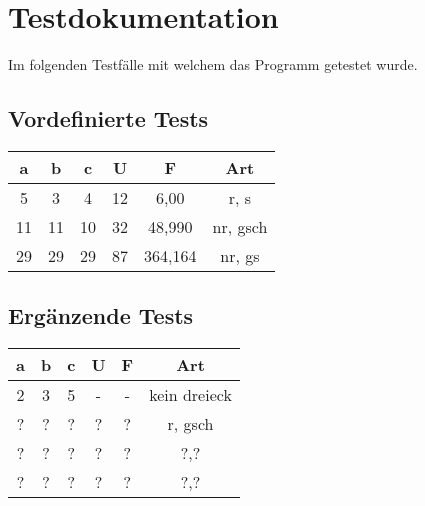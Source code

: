 \chapter{Testdokumentation}\label{ch:testdokumentation}
Im folgenden Testfälle mit welchem das Programm getestet wurde.



\section{Vordefinierte Tests}\label{sec:definierte_tests}


\begin{tabular}{|c|c|c|c|c|c|}
    \hline
    a & b & c & U & F & Art \\
    \hline
    5 & 3 & 4 & 12 & 6,00 & r, s \\
    \hline
    11 & 11 & 10 & 32 & 48,990 & nr, gsch \\
    \hline
    29 & 29 & 29 & 87 & 364,164 & nr, gs \\

    \hline
\end{tabular}

\section{Ergänzende Tests}\label{sec:ergänzende_tests}

\begin{tabular}{|c|c|c|c|c|c|}
    \hline
    a & b & c & U & F & Art \\
    \hline
    2 & 3 & 5 & - & - & kein dreieck \\
    \hline
    ? & ? & ? & ? & ? & r, gsch \\
    \hline
    ? & ? & ? & ? & ? & ?,? \\
    \hline
    ? & ? & ? & ? & ? & ?,? \\
    \hline
\end{tabular}